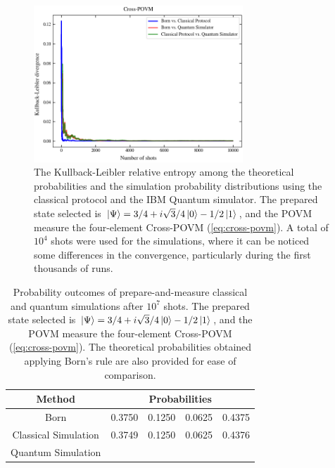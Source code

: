 \begin{figure}[h!]
\centering
\includegraphics[width=0.7\textwidth]{images/pm_povm_kl_bcq.png}
\caption{The Kullback-Leibler relative entropy among the theoretical probabilities and the simulation probability distributions using the classical protocol and the IBM Quantum simulator. The prepared state selected is $\ket{\Psi}=3/4 + i \sqrt{3}/4 \ket{0} - 1/2 \ket{1}$, and the POVM measure the four-element Cross-POVM (\ref{eq:cross-povm}). A total of $10^4$ shots were used for the simulations, where it can be noticed some differences in the convergence, particularly during the first thousands of runs.}
\label{fig:classical_quantum_results_kl}
\end{figure}

\begin{table}[h!]
\centering
\begin{tabular}{c c c c c} 
 \toprule
 Method & \multicolumn{4}{c}{Probabilities}  \\ \hline
 Born & 0.3750 & 0.1250 & 0.0625 & 0.4375 \\ 
 Classical Simulation & 0.3749 & 0.1250 & 0.0625 & 0.4376 \\ 
 Quantum Simulation & & & & \\ 
 \bottomrule
\end{tabular}
\caption{Probability outcomes of prepare-and-measure classical and quantum simulations after $10^{7}$ shots. The prepared state selected is $\ket{\Psi}=3/4 + i \sqrt{3}/4 \ket{0} - 1/2 \ket{1}$, and the POVM measure the four-element Cross-POVM (\ref{eq:cross-povm}). The theoretical probabilities obtained applying Born’s rule are also
provided for ease of comparison.}
\label{table:classical_quantum_results}
\end{table}